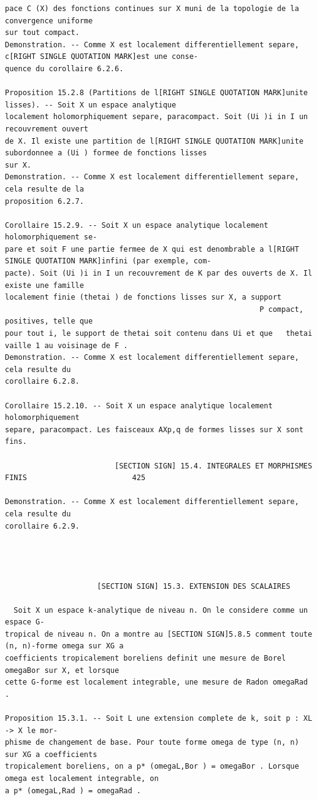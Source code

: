 \documentclass[
  11pt,
]{article}
\begin{document}
\begin{lstlisting}
pace C (X) des fonctions continues sur X muni de la topologie de la convergence uniforme
sur tout compact.
Demonstration. -- Comme X est localement differentiellement separe, c[RIGHT SINGLE QUOTATION MARK]est une conse-
quence du corollaire 6.2.6.

Proposition 15.2.8 (Partitions de l[RIGHT SINGLE QUOTATION MARK]unite lisses). -- Soit X un espace analytique
localement holomorphiquement separe, paracompact. Soit (Ui )i in I un recouvrement ouvert
de X. Il existe une partition de l[RIGHT SINGLE QUOTATION MARK]unite subordonnee a (Ui ) formee de fonctions lisses
sur X.
Demonstration. -- Comme X est localement differentiellement separe, cela resulte de la
proposition 6.2.7.

Corollaire 15.2.9. -- Soit X un espace analytique localement holomorphiquement se-
pare et soit F une partie fermee de X qui est denombrable a l[RIGHT SINGLE QUOTATION MARK]infini (par exemple, com-
pacte). Soit (Ui )i in I un recouvrement de K par des ouverts de X. Il existe une famille
localement finie (thetai ) de fonctions lisses sur X, a support
                                                          P compact, positives, telle que
pour tout i, le support de thetai soit contenu dans Ui et que   thetai vaille 1 au voisinage de F .
Demonstration. -- Comme X est localement differentiellement separe, cela resulte du
corollaire 6.2.8.

Corollaire 15.2.10. -- Soit X un espace analytique localement holomorphiquement
separe, paracompact. Les faisceaux AXp,q de formes lisses sur X sont fins.

                         [SECTION SIGN] 15.4. INTEGRALES ET MORPHISMES FINIS                        425

Demonstration. -- Comme X est localement differentiellement separe, cela resulte du
corollaire 6.2.9.




                     [SECTION SIGN] 15.3. EXTENSION DES SCALAIRES

  Soit X un espace k-analytique de niveau n. On le considere comme un espace G-
tropical de niveau n. On a montre au [SECTION SIGN]5.8.5 comment toute (n, n)-forme omega sur XG a
coefficients tropicalement boreliens definit une mesure de Borel omegaBor sur X, et lorsque
cette G-forme est localement integrable, une mesure de Radon omegaRad .

Proposition 15.3.1. -- Soit L une extension complete de k, soit p : XL -> X le mor-
phisme de changement de base. Pour toute forme omega de type (n, n) sur XG a coefficients
tropicalement boreliens, on a p* (omegaL,Bor ) = omegaBor . Lorsque omega est localement integrable, on
a p* (omegaL,Rad ) = omegaRad .


\end{lstlisting}
\end{document}
